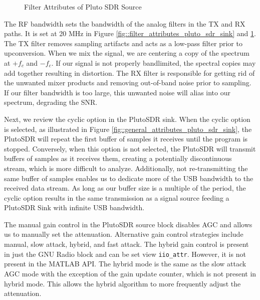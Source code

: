 \documentclass{article}
\begin{document}
\begin{figure}[H]
	\centerline{}
	\caption{Filter Attributes of Pluto SDR Source}
	\label{fig::filter_attributes_pluto_sdr_source}
\end{figure}

The RF bandwidth sets the bandwidth of the analog filters in the TX and RX paths. It is set at 20 MHz in Figure \ref{fig::filter_attributes_pluto_sdr_sink} and \ref{fig::filter_attributes_pluto_sdr_source}. The TX filter removes sampling artifacts and acts as a low-pass filter prior to upconversion. When we mix the signal, we are centering a copy of the spectrum at $+f_c$ and $-f_c$. If our signal is not properly bandlimited, the spectral copies may add together resulting in distortion. The RX filter is responsible for getting rid of the unwanted mixer products and removing out-of-band noise prior to sampling. If our filter bandwidth is too large, this unwanted noise will alias into our spectrum, degrading the SNR. 

Next, we review the cyclic option in the PlutoSDR sink. When the cyclic option is selected, as illustrated in Figure \ref{fig::general_attributes_pluto_sdr_sink}, the PlutoSDR will repeat the first buffer of samples it receives until the program is stopped. Conversely, when this option is not selected, the PlutoSDR will transmit buffers of samples as it receives them, creating a potentially discontinuous stream, which is more difficult to analyze. Additionally, not re-transmitting the same buffer of samples enables us to dedicate more of the USB bandwidth to the received data stream. As long as our buffer size is a multiple of the period, the cyclic option results in the same transmission as a signal source feeding a PlutoSDR Sink with infinite USB bandwidth.

The manual gain control in the PlutoSDR source block disables AGC and allows us to manually set the attenuation. Alternative gain control strategies include manual, slow attack, hybrid, and fast attack. The hybrid gain control is present in just the GNU Radio block and can be set view \texttt{iio\_attr}. However, it is not present in the MATLAB API. The hybrid mode is the same as the slow attack AGC mode with the exception of the gain update counter, which is not present in hybrid mode. This allows the hybrid algorithm to more frequently adjust the attenuation.
\end{document}
